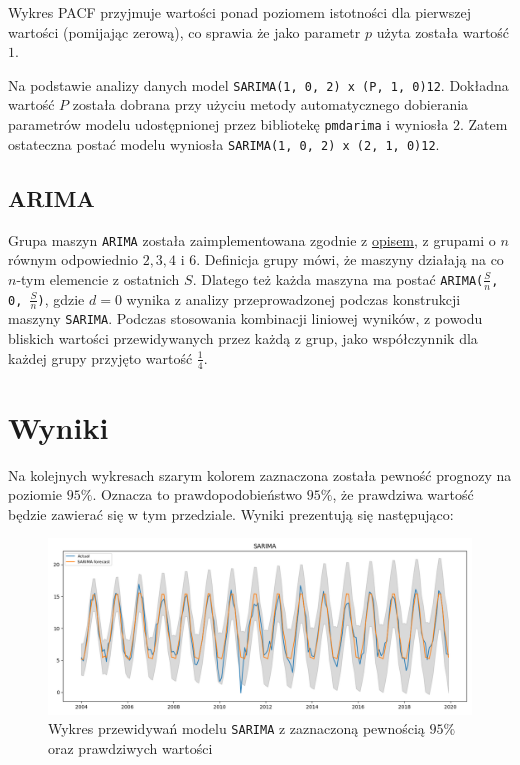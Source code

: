 \documentclass[12pt]{article}
\begin{document}
Wykres PACF przyjmuje wartości ponad poziomem istotności dla pierwszej wartości (pomijając zerową), co sprawia że jako parametr $p$ użyta została wartość $1$.

Na podstawie analizy danych model \texttt{SARIMA(1, 0, 2) x (P, 1, 0)12}. Dokładna wartość $P$ została dobrana przy użyciu metody automatycznego dobierania parametrów modelu udostępnionej przez bibliotekę \texttt{pmdarima} i wyniosła $2$. Zatem ostateczna postać modelu wyniosła \texttt{SARIMA(1, 0, 2) x (2, 1, 0)12}.

\subsection{ARIMA}

Grupa maszyn \texttt{ARIMA} została zaimplementowana zgodnie z \hyperref[group-arima]{opisem}, z grupami o $n$ równym odpowiednio $2, 3, 4$ i $6$. Definicja grupy mówi, że maszyny działają na co $n$-tym elemencie z ostatnich $S$. Dlatego też każda maszyna ma postać \texttt{ARIMA($\frac{S}{n}$, 0, $\frac{S}{n}$)}, gdzie $d = 0$ wynika z analizy przeprowadzonej podczas konstrukcji maszyny \texttt{SARIMA}. Podczas stosowania kombinacji liniowej wyników, z powodu bliskich wartości przewidywanych przez każdą z grup, jako współczynnik dla każdej grupy przyjęto wartość $\frac{1}{4}$.

\section{Wyniki}

Na kolejnych wykresach szarym kolorem zaznaczona została pewność prognozy na poziomie $95\%$. Oznacza to prawdopodobieństwo $95\%$, że prawdziwa wartość będzie zawierać się w tym przedziale. Wyniki prezentują się następująco:

\begin{figure}[H]
    \includegraphics[width=\textwidth]{img/sarima.png}
    \caption{Wykres przewidywań modelu \texttt{SARIMA} z zaznaczoną pewnością $95\%$ oraz prawdziwych wartości}
\end{figure}
\end{document}
